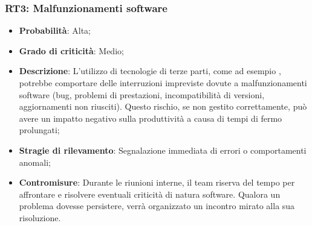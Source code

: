 \subsubsection{RT3: Malfunzionamenti software}
\begin{itemize}
    \item \textbf{Probabilità}: Alta;
    \item \textbf{Grado di criticità}: Medio;
    \item \textbf{Descrizione}: L'utilizzo di tecnologie di terze parti, come ad esempio , potrebbe comportare delle interruzioni impreviste dovute a malfunzionamenti software (bug, problemi di prestazioni, incompatibilità di versioni, aggiornamenti non riusciti). Questo rischio, se non gestito correttamente, può avere un impatto negativo sulla produttività a causa di tempi di fermo prolungati;
    \item \textbf{Stragie di rilevamento}: Segnalazione immediata di errori o comportamenti anomali;
    \item \textbf{Contromisure}: Durante le riunioni interne, il team riserva del tempo per affrontare e risolvere eventuali criticità di natura software. Qualora un problema dovesse persistere, verrà organizzato un incontro mirato alla sua risoluzione.
\end{itemize}
